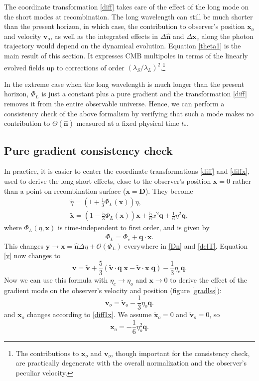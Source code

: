 \documentclass[12pt]{article}
\numberwithin{equation}{section}
\def\bsb{\boldsymbol}
\def\bea{\begin{eqnarray}}
\def\eea{\end{eqnarray}}
\def\be{\begin{equation}}
\def\ee{\end{equation}}
\def\n{\bsb{\hat n}}
\def\O{\mathcal{O}}
\def\x{{\bsb x}}
\def\v{\bsb v}
\begin{document}
The coordinate transformation \eqref{diff} takes care of the effect of the long mode on the short modes at recombination. The long wavelength can still be much shorter than the present horizon, in which case, the contribution to observer's position $\x_o$ and velocity $\v_o$, as well as the integrated effects in $\Delta\n$ and $\Delta\x_e$ along the photon trajectory would depend on the dynamical evolution. Equation \eqref{theta1} is the main result of this section. It expresses CMB multipoles in terms of the linearly evolved fields up to corrections of order $(\lambda_S/\lambda_L)^2$.\footnote{The contributions to $\x_o$ and $\v_o$, though important for the consistency check, are practically degenerate with the overall normalization and the observer's peculiar velocity.}

In the extreme case when the long wavelength is much longer than the present horizon, $\Phi_L$ is just a constant plus a pure gradient and the transformation \eqref{diff} removes it from the entire observable universe. Hence, we can perform a consistency check of the above formalism by verifying that such a mode makes no contribution to $\Theta(\n)$ measured at a fixed physical time $t_*$.

\subsection{Pure gradient consistency check}

In practice, it is easier to center the coordinate transformations \eqref{diff} and \eqref{diffx}, used to derive the long-short effects, close to the observer's position $\bsb x =0$ rather than a point on recombination surface ($\x =\bsb D$). They become
\bea
\label{diff1}
\tilde\eta = (1+\frac{1}{3}\Phi_L(\bsb x))\eta,~~~~~~~~~~~~~~~~~~~~~\\
\label{diff1x}
\bsb{\tilde x}=(1-\frac{5}{3}\Phi_L(\bsb x))\bsb x+\frac{5}{6}x^2 \bsb q 
+\frac{1}{6}\eta^2 \bsb q,
\eea
where $\Phi_L(\eta,\bsb x)$ is time-independent to first order, and is given by
\be
\label{phi2}
\Phi_L = \bar\Phi_e + \bsb q\cdot \bsb x.
\ee
This changes $\bsb y \to \bsb x=\n \Delta\eta +\O(\Phi_L)$ everywhere in \eqref{Dn} and \eqref{delT}. Equation \eqref{v} now changes to
\be
\bsb v=\bsb{\tilde v} +\frac{5}{3}(\bsb{\tilde v}\cdot \bsb q \; \bsb{x} - \bsb{\tilde v}\cdot \bsb{x}\; \bsb q)-\frac{1}{3}\eta_e \bsb q.
\ee
Now we can use this formula with $\eta_e\to \eta_o$ and $\x \to 0$ to derive the effect of the gradient mode on the observer's velocity and position (figure \ref{gradlss}):
\be
\label{vo}
\bsb v_o=\tilde{\bsb v}_o-\frac{1}{3}\eta_o \bsb q.
\ee
and $\bsb x_o$ changes according to \eqref{diff1x}. We assume $\tilde {\bsb x}_o=0$ and $\tilde {\bsb v} _o=0$, so
\be
\label{xo}
\bsb x_o = -\frac{1}{6}\eta_o^2\bsb q. 
\ee
\end{document}
